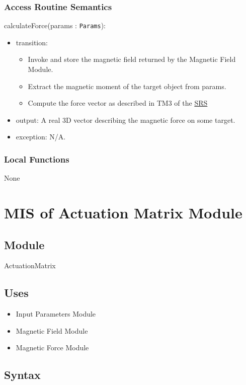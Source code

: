 \documentclass[12pt, titlepage]{article}
\begin{document}
\subsubsection{Access Routine Semantics}
\noindent calculateForce(params : \texttt{Params}):
\begin{itemize}
\item transition: 
\begin{itemize}
  \item Invoke and store the magnetic field returned by the Magnetic Field Module. 
  \item Extract the magnetic moment of the target object from params. 
  \item Compute the force vector as described in TM3 of the \href{https://github.com/husseinsd1/optimal-em-arrangement/blob/main/docs/SRS/SRS.pdf}{SRS}
\end{itemize}
\item output: A real 3D vector describing the magnetic force on some target. 
\item exception: N/A.
\end{itemize}

\subsubsection{Local Functions}
None
\newpage

\section{MIS of Actuation Matrix Module} \label{MISActMatrix}

\subsection{Module}
ActuationMatrix

\subsection{Uses}
\begin{itemize}
  \item Input Parameters Module
  \item Magnetic Field Module
  \item Magnetic Force Module 
\end{itemize}

\subsection{Syntax}
\end{document}
